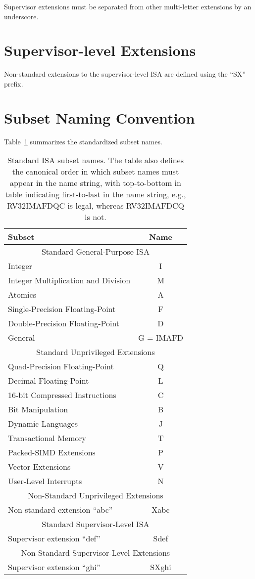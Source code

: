Supervisor extensions must be separated from other multi-letter extensions
by an underscore.

\section{Supervisor-level Extensions}
Non-standard extensions to the supervisor-level ISA are defined using
the ``SX'' prefix.

\section{Subset Naming Convention}
Table~\ref{isanametable} summarizes the standardized subset names.
~\\
\begin{table}[h]
\center
\begin{tabular}{|l|c|}
\hline
Subset & Name \\
\hline
\hline
\multicolumn{2}{|c|}{Standard General-Purpose ISA}\\
\hline
Integer & I \\
Integer Multiplication and Division & M \\
Atomics & A \\
Single-Precision Floating-Point & F \\
Double-Precision Floating-Point & D \\
\hline
General & G = IMAFD \\
\hline
\multicolumn{2}{|c|}{Standard Unprivileged Extensions}\\
\hline
Quad-Precision Floating-Point & Q \\
Decimal Floating-Point & L \\
16-bit Compressed Instructions & C \\
Bit Manipulation & B \\
Dynamic Languages & J \\
Transactional Memory & T \\
Packed-SIMD Extensions & P \\
Vector Extensions & V \\
User-Level Interrupts & N \\
\hline
\hline
\multicolumn{2}{|c|}{Non-Standard Unprivileged Extensions}\\
\hline
Non-standard extension ``abc'' & Xabc \\
\hline
\hline
\multicolumn{2}{|c|}{Standard Supervisor-Level ISA}\\
\hline
Supervisor extension ``def'' & Sdef \\
\hline
\hline
\multicolumn{2}{|c|}{Non-Standard Supervisor-Level Extensions}\\
\hline
Supervisor extension ``ghi'' & SXghi \\
\hline
\end{tabular}
\caption{Standard ISA subset names.  The table also defines the
  canonical order in which subset names must appear in the name
  string, with top-to-bottom in table indicating first-to-last in the
  name string, e.g., RV32IMAFDQC is legal, whereas RV32IMAFDCQ is not.}
\label{isanametable}
\end{table}


